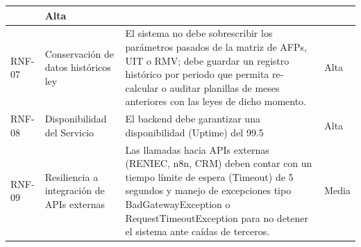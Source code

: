 \begin{longtable}{|l|p{4cm}|p{6cm}|l|}
    & Alta \\ \hline
    RNF-07 & 
    Conservación de datos históricos ley & 
    El sistema no debe sobrescribir los parámetros pasados de la matriz de AFPs, UIT o RMV; debe guardar un registro histórico por periodo que permita re-calcular o auditar planillas de meses anteriores con las leyes de dicho momento.
    & Alta \\ \hline
    RNF-08 & 
    Disponibilidad del Servicio & 
    El backend debe garantizar una disponibilidad (Uptime) del 99.5%
    & Alta \\ \hline
    RNF-09 & 
    Resiliencia a integración de APIs externas & 
    Las llamadas hacia APIs externas (RENIEC, n8n, CRM) deben contar con un tiempo límite de espera (Timeout) de 5 segundos y manejo de excepciones tipo BadGatewayException o RequestTimeoutException para no detener el sistema ante caídas de terceros.
    & Media \\ \hline
\end{longtable}